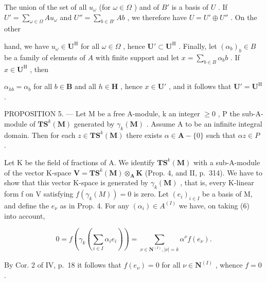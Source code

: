 The union of the set of all \(u_{\omega}\) (for \(\omega \in \Omega\) ) and of \(B'\) is a basis of \(U\) . If \(U' = \sum_{\omega \in \Omega} Au_{\omega}\) and \(U'' = \sum_{b \in B'} Ab\) , we therefore have \(U = U' \oplus U''\) . On the other

hand, we have \(u_{\omega} \in \mathbf{U}^{\mathrm{H}}\) for all \(\omega \in \Omega\) , hence \(\mathbf{U}' \subset \mathbf{U}^{\mathrm{H}}\) . Finally, let \((\alpha_b)_b \in B\) be a family of elements of \(A\) with finite support and let \(x = \sum_{b \in B} \alpha_b b\) . If \(x \in \mathbf{U}^{\mathrm{H}}\) , then

\(\alpha_{hb} = \alpha_b\) for all \(b \in \mathbf{B}\) and all \(h \in \mathbf{H}\) , hence \(x \in \mathbf{U}'\) , and it follows that \(\mathbf{U}' = \mathbf{U}^{\mathrm{H}}\) .

PROPOSITION 5. --- Let M be a free A-module, k an integer \(\geqslant0\) , P the sub-A-module of \(\mathbf{TS}^{k}(\mathbf{M})\) generated by \(\gamma_{k}(\mathbf{M})\) . Assume A to be an infinite integral domain. Then for each \(z\in\mathbf{TS}^{k}(\mathbf{M})\) there exists \(\alpha\in\mathbf{A}-\{0\}\) such that \(\alpha z\in P\) .

Let K be the field of fractions of A. We identify \(\mathbf{T}\mathbf{S}^{k}(\mathbf{M})\) with a sub-A-module of the vector K-space \(\mathbf{V} = \mathbf{T}\mathbf{S}^{k}(\mathbf{M}) \otimes_{\mathbf{A}} \mathbf{K}\) (Prop. 4, and II, p.~314). We have to show that this vector K-space is generated by \(\gamma_{k}(\mathbf{M})\) , that is, every K-linear form f on V satisfying \(f(\gamma_k(M)) = 0\) is zero. Let \((e_i)_{i \in I}\) be a basis of M, and define the \(e_\nu\) as in Prop. 4. For any \((\alpha_i) \in A^{(I)}\) we have, on taking (6) into account,

\[
0 = f \left(\gamma_ {k} \left(\sum_ {i \in I} \alpha_ {i} e _ {i}\right)\right) = \sum_ {\nu \in \mathbf {N} ^ {(I)}, | \nu | = k} \alpha^ {\nu} f (e _ {\nu}).
\]

By Cor. 2 of IV, p.~18 it follows that \(f(e_{\nu}) = 0\) for all \(\nu \in \mathbf{N}^{(I)}\) , whence \(f = 0\) .

